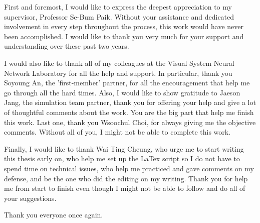 \documentclass[master,english,final]{kaist-ucs}
\begin{document}

\acknowledgement[english]

	First and foremost, I would like to express the deepest appreciation to my supervisor, Professor Se-Bum Paik. Without your assistance and dedicated involvement in every step throughout the process, this work would have never been accomplished. I would like to thank you very much for your support and understanding over these past two years. 
	
	I would also like to thank all of my colleagues at the Visual System Neural Network Laboratory for all the help and support. In particular, thank you Soyoung An, the 'first-member' partner, for all the encouragement that help me go through all the hard times. Also, I would like to show gratitude to Jaeson Jang, the simulation team partner, thank you for offering your help and give a lot of thoughtful comments about the work. You are the big part that help me finish this work. Last one, thank you Wsoochul Choi, for always giving me the objective comments. Without all of you, I might not be able to complete this work.
	
	Finally, I would like to thank Wai Ting Cheung, who urge me to start writing this thesis early on, who help me set up the LaTex script so I do not have to spend time on technical issues, who help me practiced and gave comments on my defense, and be the one who did the editing on my writing. Thank you for help me from start to finish even though I might not be able to follow and do all of your suggestions.
	
	Thank you everyone once again. 
	
\curriculumvitae[english]

    \begin{personaldata}
        \address    {30/1 Moo.6 Phayakhan, Muang Phatthalung, Phatthalung, Thailand 93000}
    \end{personaldata}
\end{document}
